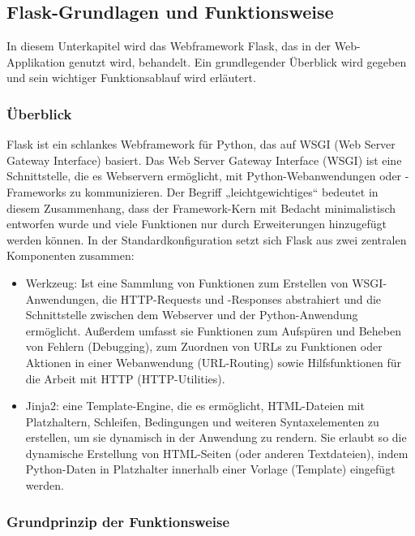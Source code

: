 \subsection{Flask-Grundlagen und Funktionsweise}\label{subsec:flask-grundlagen-und-funktionsweise}

In diesem Unterkapitel wird das Webframework Flask, das in der Web-Applikation genutzt wird, behandelt.
Ein grundlegender Überblick wird gegeben und sein wichtiger Funktionsablauf wird erläutert.

\subsubsection{Überblick}

Flask ist ein schlankes Webframework für Python, das auf WSGI (Web Server Gateway Interface) basiert.
Das Web Server Gateway Interface (WSGI) ist eine Schnittstelle, die es Webservern ermöglicht, mit Python-Webanwendungen oder -Frameworks zu kommunizieren.  Der Begriff „leichtgewichtiges“ bedeutet in diesem Zusammenhang, dass der Framework-Kern mit Bedacht minimalistisch entworfen wurde und viele Funktionen nur durch Erweiterungen hinzugefügt werden können.
In der Standardkonfiguration setzt sich Flask aus zwei zentralen Komponenten zusammen: \cite{FlaskDocumentation}
\begin{itemize}

    \item Werkzeug: Ist eine Sammlung von Funktionen zum Erstellen von WSGI-Anwendungen, die HTTP-Requests und -Responses abstrahiert und die Schnittstelle zwischen dem Webserver und der Python-Anwendung ermöglicht.  Außerdem umfasst sie Funktionen zum Aufspüren und Beheben von Fehlern (Debugging), zum Zuordnen von URLs zu Funktionen oder Aktionen in einer Webanwendung (URL-Routing) sowie Hilfsfunktionen für die Arbeit mit HTTP (HTTP-Utilities).

    \item Jinja2: eine Template-Engine, die es ermöglicht, HTML-Dateien mit Platzhaltern, Schleifen, Bedingungen und weiteren Syntaxelementen zu erstellen, um sie dynamisch in der Anwendung zu rendern. Sie erlaubt so die dynamische Erstellung von HTML-Seiten (oder anderen Textdateien), indem Python-Daten in Platzhalter innerhalb einer Vorlage (Template) eingefügt werden.

\end{itemize}


\subsubsection{Grundprinzip der Funktionsweise}


